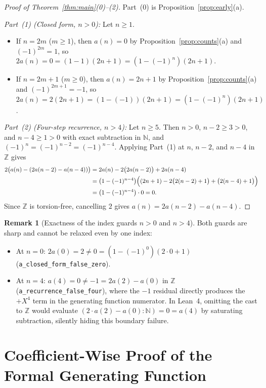 \documentclass[11pt]{article}
\theoremstyle{definition}
\newtheorem{remark}[theorem]{Remark}
\newcommand{\N}{\mathbb{N}}
\newcommand{\Z}{\mathbb{Z}}
\begin{document}
\begin{proof}[Proof of Theorem~\ref{thm:main}(0)--(2)]
Part~(0) is Proposition~\ref{prop:early}(a).

\emph{Part~(1) (Closed form, $n > 0$):} Let $n \ge 1$.
\begin{itemize}
\item If $n = 2m$ ($m \ge 1$), then $a(n) = 0$ by Proposition~\ref{prop:counts}(a) and $(-1)^{2m} = 1$, so $2a(n) = 0 = (1 - 1)(2n + 1) = (1 - (-1)^n)(2n + 1)$.
\item If $n = 2m + 1$ ($m \ge 0$), then $a(n) = 2n + 1$ by Proposition~\ref{prop:counts}(a) and $(-1)^{2m+1} = -1$, so $2a(n) = 2(2n + 1) = (1 - (-1))(2n + 1) = (1 - (-1)^n)(2n + 1)$.
\end{itemize}

\emph{Part~(2) (Four-step recurrence, $n > 4$):} Let $n \ge 5$. Then $n > 0$, $n - 2 \ge 3 > 0$, and $n - 4 \ge 1 > 0$ with exact subtraction in $\N$, and $(-1)^n = (-1)^{n-2} = (-1)^{n-4}$. Applying Part~(1) at $n$, $n - 2$, and $n - 4$ in $\Z$ gives
\begin{align*}
2\bigl(a(n) - (2a(n - 2) - a(n - 4))\bigr)
&= 2a(n) - 2\bigl(2a(n - 2)\bigr) + 2a(n - 4) \\
&= \bigl(1 - (-1)^{n-4}\bigr)\Bigl((2n + 1) - 2\bigl(2(n - 2) + 1\bigr) + \bigl(2(n - 4) + 1\bigr)\Bigr) \\
&= \bigl(1 - (-1)^{n-4}\bigr)\cdot 0 = 0.
\end{align*}
Since $\Z$ is torsion-free, cancelling $2$ gives $a(n) = 2a(n - 2) - a(n - 4)$.
\end{proof}

\begin{remark}[Exactness of the index guards $n > 0$ and $n > 4$]
Both guards are sharp and cannot be relaxed even by one index:
\begin{itemize}
\item At $n = 0$: $2a(0) = 2 \ne 0 = (1 - (-1)^0)(2\cdot 0 + 1)$ (\texttt{a\_closed\_form\_false\_zero}).
\item At $n = 4$: $a(4) = 0 \ne -1 = 2a(2) - a(0)$ in $\Z$ (\texttt{a\_recurrence\_false\_four}), where the $-1$ residual directly produces the $+X^4$ term in the generating function numerator. In Lean~4, omitting the cast to $\Z$ would evaluate $(2 \cdot a(2) - a(0) : \N) = 0 = a(4)$ by saturating subtraction, silently hiding this boundary failure.
\end{itemize}
\end{remark}

\section{Coefficient-Wise Proof of the Formal Generating Function}
\end{document}
